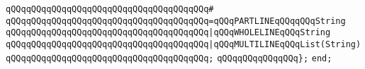 \verb|qQQqqQQqqQQqqQQqqQQqqQQqqQQqqQQqqQQqqQQq#|\newline
\verb|qQQqqQQqqQQqqQQqqQQqqQQqqQQqqQQqqQQqqQQq=qQQqPARTLINEqQQqqQQqString|\newline
\verb|qQQqqQQqqQQqqQQqqQQqqQQqqQQqqQQqqQQqqQQq|\verb#|qQQqWHOLELINEqQQqString#\newline
\verb|qQQqqQQqqQQqqQQqqQQqqQQqqQQqqQQqqQQqqQQq|\verb#|qQQqMULTILINEqQQqList(String)#\newline
\verb|qQQqqQQqqQQqqQQqqQQqqQQqqQQqqQQqqQQqqQQq;|\newline
\verb|qQQqqQQqqQQqqQQq};|\newline
\verb|end;|\newline
\newline
\newline
\newline

